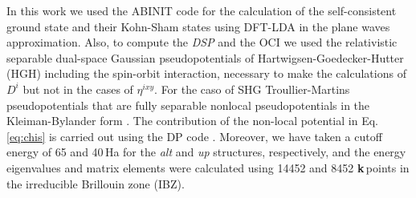 \documentclass[aps,pra,11pt,tightenlines,showpacs,superscriptaddress,groupedaddress]{revtex4-1}
\newcommand{\ea}{$\eta^{ixy}$}
\begin{document}
In this work we used the ABINIT code \cite{torrent2008implementation} for the
calculation of the self-consistent ground state and their Kohn-Sham states
using DFT-LDA in the plane waves approximation. Also, to compute the \emph{DSP}
and the OCI we used the relativistic separable dual-space Gaussian
pseudopotentials of Hartwigsen-Goedecker-Hutter (HGH)
\cite{hartwigsen1998relativistic} including the spin-orbit interaction,
necessary to make the calculations of $D^{i} $ but not in the cases of {\ea}.
For the caso of SHG Troullier-Martins pseudopotentials
\cite{troullier1991efficient} that are fully separable nonlocal
pseudopotentials in the Kleiman-Bylander form \cite{kleinman1982efficacious}.
The contribution of the non-local potential in Eq. \ref{eq:chis} is carried out
using the DP code \cite{olevanoDP}. Moreover, we have taken a cutoff energy of
65 and 40\,Ha for the \emph{alt} and \emph{up} structures, respectively, and
the energy eigenvalues and matrix elements were calculated using 14452 and 8452
\textbf{k}\,points in the irreducible Brillouin zone (IBZ).
\end{document}
